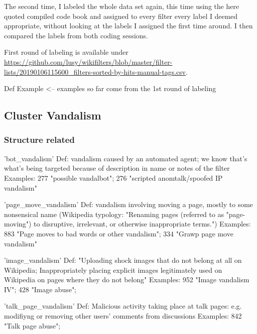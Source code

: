 The second time, I labeled the whole data set again, this time using the here quoted compiled code book and assigned to every filter every label I deemed appropriate, without looking at the labels I assigned the first time around.
I then compared the labels from both coding sessions. %

First round of labeling is available under \url{https://github.com/lusy/wikifilters/blob/master/filter-lists/20190106115600_filters-sorted-by-hits-manual-tags.csv}.


Def
Example <-- examples so far come from the 1st round of labeling


\subsection{Cluster Vandalism}

\subsubsection{Structure related}

'bot\_vandalism'
  Def: vandalism caused by an automated agent; we know that's what's being targeted because of description in name or notes of the filter
  Examples: 277 "possible vandalbot"; 276 "scripted anomtalk/spoofed IP vandalism"

'page\_move\_vandalism'
  Def: vandalism involving moving a page, mostly to some nonsensical name (Wikipedia typology: "Renaming pages (referred to as "page-moving") to disruptive, irrelevant, or otherwise inappropriate terms.")
  Examples: 883 "Page moves to bad words or other vandalism"; 334 "Grawp page move vandalism"

'image\_vandalism'
  Def: "Uploading shock images that do not belong at all on Wikipedia; Inappropriately placing explicit images legitimately used on Wikipedia on pages where they do not belong"
  Examples: 952 "Image vandalism IV"; 428 "Image abuse";

'talk\_page\_vandalism'
  Def: Malicious activity taking place at talk pages: e.g. modifiyng or removing other users' comments from discussions
  Examples: 842 "Talk page abuse";

